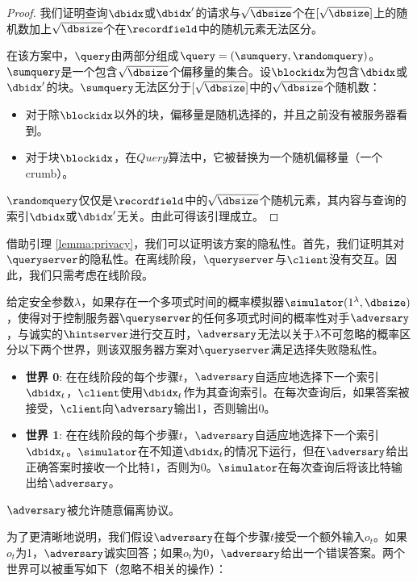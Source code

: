 \begin{proof}
我们证明查询$\dbidx$或$\dbidx'$的请求与$\sqrt{\dbsize}$个在$[\sqrt{\dbsize}]$上的随机数加上$\sqrt{\dbsize}$个在$\recordfield$中的随机元素无法区分。

在该方案中，$\query$由两部分组成$\query = (\sumquery, \randomquery)$。$\sumquery$是一个包含$\sqrt{\dbsize}$个偏移量的集合。设$\blockidx$为包含$\dbidx$或$\dbidx'$的块。$\sumquery$无法区分于$[\sqrt{\dbsize}]$中的$\sqrt{\dbsize}$个随机数：
\begin{itemize}
    \item 对于除$\blockidx$以外的块，偏移量是随机选择的，并且之前没有被服务器看到。
    \item 对于块$\blockidx$，在$Query$算法中，它被替换为一个随机偏移量（一个crumb）。
\end{itemize}
$\randomquery$仅仅是$\recordfield$中的$\sqrt{\dbsize}$个随机元素，其内容与查询的索引$\dbidx$或$\dbidx'$无关。由此可得该引理成立。
\end{proof}

借助引理 \ref{lemma:privacy}，我们可以证明该方案的隐私性。首先，我们证明其对$\queryserver$的隐私性。在离线阶段，$\queryserver$与$\client$没有交互。因此，我们只需考虑在线阶段。

\begin{definition}
给定安全参数$\lambda$，如果存在一个多项式时间的概率模拟器$\simulator(1^\lambda, \dbsize)$，使得对于控制服务器$\queryserver$的任何多项式时间的概率性对手$\adversary$，与诚实的$\hintserver$进行交互时，$\adversary$无法以关于$\lambda$不可忽略的概率区分以下两个世界，则该双服务器方案对$\queryserver$满足选择失败隐私性。

\begin{itemize}
    \item \textbf{世界 0}: 在在线阶段的每个步骤$t$，$\adversary$自适应地选择下一个索引$\dbidx_t$，$\client$使用$\dbidx_t$作为其查询索引。在每次查询后，如果答案被接受，$\client$向$\adversary$输出1，否则输出0。
    \item \textbf{世界 1}: 在在线阶段的每个步骤$t$，$\adversary$自适应地选择下一个索引$\dbidx_t$。$\simulator$在不知道$\dbidx_t$的情况下运行，但在$\adversary$给出正确答案时接收一个比特1，否则为0。$\simulator$在每次查询后将该比特输出给$\adversary$。
\end{itemize}$\adversary$被允许随意偏离协议。
\end{definition}

为了更清晰地说明，我们假设$\adversary$在每个步骤$t$接受一个额外输入$o_t$。如果$o_t$为1，$\adversary$诚实回答；如果$o_t$为0，$\adversary$给出一个错误答案。两个世界可以被重写如下（忽略不相关的操作）：

